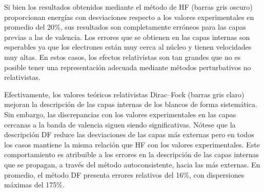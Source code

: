 Si bien los resultados obtenidos mediante el método de HF (barras gris 
oscuro) proporcionan energías con desviaciones respecto a los valores 
experimentales en promedio del 20\%, sus resultados son completamente 
erróneos para las capas previas a las de valencia. Los errores que se 
obtienen en las 
capas internas son esperables ya que los electrones están muy cerca al 
núcleo y tienen velocidades muy altas. En estos casos, los efectos 
relativistas son tan grandes que no es posible tener una representación 
adecuada mediante métodos perturbativos no relativistas. %


Efectivamente, los valores teóricos relativistas Dirac--Fock (barras 
gris claro) mejoran la descripción de las capas internas de los blancos 
de forma sistemática. Sin embargo, las discrepancias con los valores 
experimentales en las capas cercanas a la banda de valencia siguen 
siendo significativas. Nótese que la descripción DF reduce las 
desviaciones de las capas más externas pero en todos los casos mantiene 
la misma relación que HF con los valores experimentales. Este 
comportamiento es atribuible a los errores en la descripción de las 
capas internas que se propagan, a través del método autoconsistente, 
hacia las más externas. En promedio, el método DF presenta errores 
relativos del 16\%, con dispersiones máximas del 175\%. 

